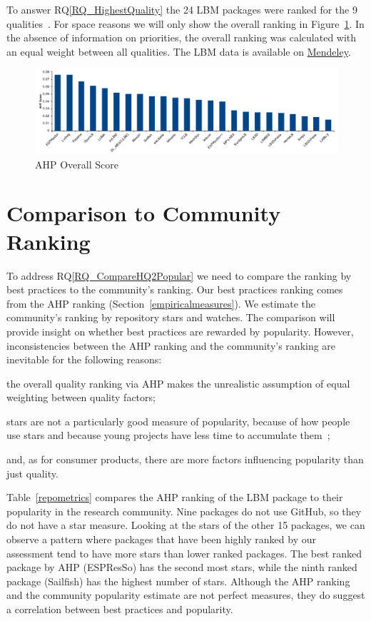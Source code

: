 \documentclass[runningheads]{llncs}
\newcommand{\rqref}[1]{RQ\ref{#1}}
\begin{document}
To answer \rqref{RQ_HighestQuality} the 24 LBM packages were ranked for the 9
qualities~\cite{Michalski2021}.  For space reasons we will only show the overall
ranking in Figure~\ref{Fig_OverallScore}. In the absence of information on
priorities, the overall ranking was calculated with an equal weight between all
qualities.  The LBM data is available on
\href{https://data.mendeley.com/datasets/5dym63wn6z/1} {Mendeley}.

\begin{figure}[h!]
	\centering
		\includegraphics[width=1.0\textwidth]{./figures/finalscore_chart.pdf}
		\caption{AHP Overall Score}
		\label{Fig_OverallScore}
\end{figure}

\section{Comparison to Community Ranking} \label{repmetrics}

To address \rqref{RQ_CompareHQ2Popular} we need to compare the ranking by best
practices to the community's ranking.  Our best practices ranking comes from the
AHP ranking (Section~\ref{empiricalmeasures}).  We estimate the community's
ranking by repository stars and watches.  The comparison will provide insight on
whether best practices are rewarded by popularity.  However, inconsistencies
between the AHP ranking and the community's ranking are inevitable for the
following reasons: 
\begin{inparaenum}[i)]
	\item the overall quality ranking via AHP makes the unrealistic assumption
	of equal weighting between quality factors;
	\item stars are not a particularly good measure of popularity,
	because of how people use stars and because young projects have less time to
	accumulate them~\cite{Szulik2017}; 
	\item and, as for consumer products, there are more factors influencing
	popularity than just quality.
\end{inparaenum}

Table~\ref{repometrics} compares the AHP ranking of the LBM package to their
popularity in the research community.  Nine packages do not use GitHub, so they
do not have a star measure. Looking at the stars of the other 15 packages,
we can observe a pattern where packages that have been highly ranked by our
assessment tend to have more stars than lower ranked packages. The best ranked
package by AHP (ESPResSo) has the second most stars, while the ninth ranked
package (Sailfish) has the highest number of stars. Although the AHP ranking and
the community popularity estimate are not perfect measures, they do suggest a
correlation between best practices and popularity.
\end{document}
